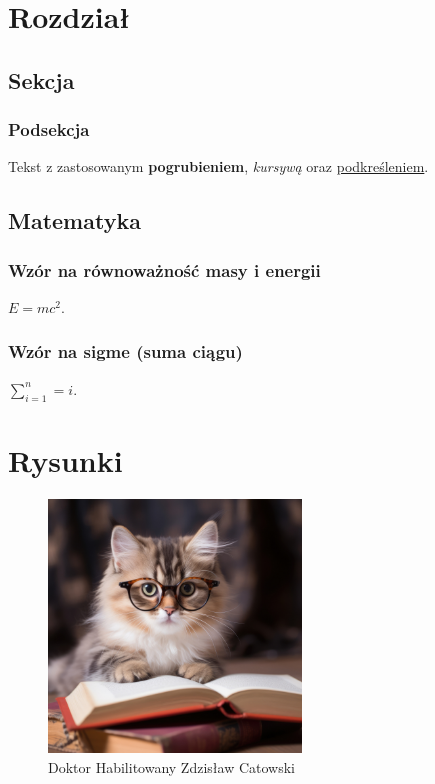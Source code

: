 \documentclass{article}
\begin{document}
\section{Rozdział}

\lipsum[1-2]

\subsection{Sekcja}

\subsubsection{Podsekcja}

\lipsum[1-2]

Tekst z zastosowanym \textbf{pogrubieniem}, \textit{kursywą} oraz \underline{podkreśleniem}.

\subsection{Matematyka}

\subsubsection{Wzór na równoważność masy i energii} 
$E=mc^2$.

\subsubsection{Wzór na sigme (suma ciągu)} 
$\sum_{i=1}^n=i$. \cite{autor2}

\section{Rysunki}

\begin{figure}[h]
    \centering
    \includegraphics[width=0.6\textwidth]{image2.png}
    \caption{Doktor Habilitowany Zdzisław Catowski}
    \label{fig:rys1}
\end{figure}
\end{document}
